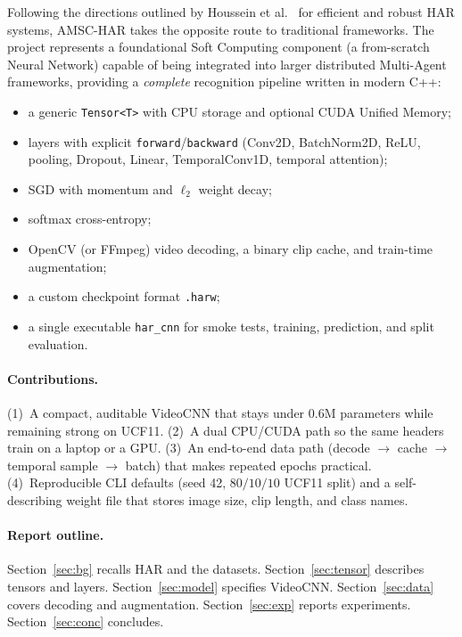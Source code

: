 \documentclass[11pt,a4paper]{article}
\begin{document}
Following the directions outlined by Houssein et al.~\cite{houssein2025integrating} for efficient and robust HAR systems, AMSC-HAR takes the opposite route to traditional frameworks. The project represents a foundational Soft Computing component (a from-scratch Neural Network) capable of being integrated into larger distributed Multi-Agent frameworks, providing a \emph{complete} recognition pipeline written in modern C++:
\begin{itemize}
  \item a generic \texttt{Tensor<T>} with CPU storage and optional
        CUDA Unified Memory;
  \item layers with explicit \texttt{forward}/\texttt{backward} (Conv2D,
        BatchNorm2D, ReLU, pooling, Dropout, Linear, TemporalConv1D,
        temporal attention);
  \item SGD with momentum and $\ell_2$ weight decay;
  \item softmax cross-entropy;
  \item OpenCV (or FFmpeg) video decoding, a binary clip cache, and
        train-time augmentation;
  \item a custom checkpoint format \texttt{.harw};
  \item a single executable \texttt{har\_cnn} for smoke tests, training,
        prediction, and split evaluation.
\end{itemize}

\paragraph{Contributions.}
(1)~A compact, auditable VideoCNN that stays under 0.6M parameters while
remaining strong on UCF11.
(2)~A dual CPU/CUDA path so the same headers train on a laptop or a GPU.
(3)~An end-to-end data path (decode $\to$ cache $\to$ temporal sample
$\to$ batch) that makes repeated epochs practical.
(4)~Reproducible CLI defaults (seed 42, $80/10/10$ UCF11 split) and a
self-describing weight file that stores image size, clip length, and class
names.

\paragraph{Report outline.}
Section~\ref{sec:bg} recalls HAR and the datasets.
Section~\ref{sec:tensor} describes tensors and layers.
Section~\ref{sec:model} specifies VideoCNN.
Section~\ref{sec:data} covers decoding and augmentation.
Section~\ref{sec:exp} reports experiments.
Section~\ref{sec:conc} concludes.
\end{document}
